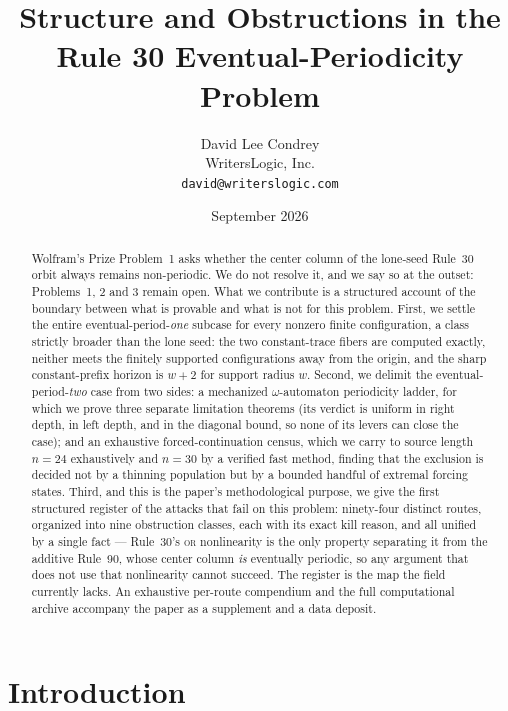 \documentclass[11pt]{article}
\title{\vspace{-2em}Structure and Obstructions in the\\Rule 30 Eventual-Periodicity Problem}
\author{David Lee Condrey\\WritersLogic, Inc.\\\texttt{david@writerslogic.com}}
\date{September 2026}
\theoremstyle{definition}
\begin{document}
\maketitle

\begin{abstract}
Wolfram's Prize Problem~1 asks whether the center column of the lone-seed
Rule~30 orbit always remains non-periodic. We do not resolve it, and we say so
at the outset: Problems~1, 2 and 3 remain open. What we contribute is a structured
account of the boundary between what is provable and what is not for this
problem. First, we settle the entire eventual-period-\emph{one} subcase for
every nonzero finite configuration, a class strictly broader than the lone
seed: the two constant-trace fibers are computed exactly, neither meets the
finitely supported configurations away from the origin, and the sharp
constant-prefix horizon is $w+2$ for support radius $w$. Second, we delimit the
eventual-period-\emph{two} case from two sides: a mechanized
$\omega$-automaton periodicity ladder, for which we prove three separate
limitation theorems (its verdict is uniform in right depth, in left depth, and
in the diagonal bound, so none of its levers can close the case); and an
exhaustive forced-continuation census, which we carry to source length $n=24$
exhaustively and $n=30$ by a verified fast method, finding that the exclusion is
decided not by a thinning population but by a bounded handful of extremal
forcing states. Third, and this is the paper's methodological purpose, we give
the first structured register of the attacks that fail on this problem:
ninety-four distinct routes, organized into nine obstruction classes, each with
its exact kill reason, and all unified by a single fact --- Rule~30's
\textsc{or} nonlinearity is the only property separating it from the additive
Rule~90, whose center column \emph{is} eventually periodic, so any argument that
does not use that nonlinearity cannot succeed. The register is the map the field
currently lacks. An exhaustive per-route compendium and the full computational
archive accompany the paper as a supplement and a data deposit.
\end{abstract}

\tableofcontents

\section{Introduction}
\end{document}

